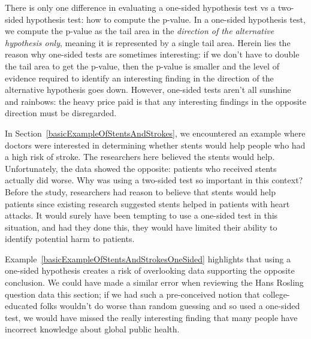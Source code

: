 There is only one difference in evaluating a one-sided
hypothesis test vs a two-sided hypothesis test: how to
compute the p-value.
In a one-sided hypothesis test, we compute the p-value as
the tail area in the \emph{direction of the alternative
hypothesis only}, meaning it is represented by a single
tail area. Herein lies the reason why one-sided tests
are sometimes interesting: if we don't have to double
the tail area to get the p-value, then the p-value is
smaller and the level of evidence required to identify
an interesting finding in the direction of the
alternative hypothesis goes down.
However, one-sided tests aren't all sunshine and rainbows:
the heavy price paid is that any interesting findings
in the opposite direction must be disregarded.

\begin{examplewrap}
\begin{nexample}{
    In Section~\ref{basicExampleOfStentsAndStrokes},
    we encountered an example where doctors were interested
    in determining whether stents would help people who had
    a high risk of stroke.
    The researchers here believed the stents would help.
    Unfortunately, the data showed the opposite:
    patients who received stents actually did worse.
    Why was using a two-sided test so important in
    this context?}
    \label{basicExampleOfStentsAndStrokesOneSided}
  Before the study, researchers had reason to believe
  that stents would help patients since existing research
  suggested stents helped in patients with heart attacks.
  It would surely have been tempting to use a one-sided
  test in this situation, and had they done this,
  they would have limited their ability to identify
  potential harm to patients.
\end{nexample}
\end{examplewrap}

Example~\ref{basicExampleOfStentsAndStrokesOneSided}
highlights that using a one-sided hypothesis creates
a risk of overlooking data supporting the opposite
conclusion.
We could have made a similar error when reviewing
the Hans Rosling question data this section;
if we had such a pre-conceived notion that
college-educated folks wouldn't do worse than random
guessing and so used a one-sided test,
we would have missed the really interesting finding
that many people have incorrect knowledge about
global public health.
%    

